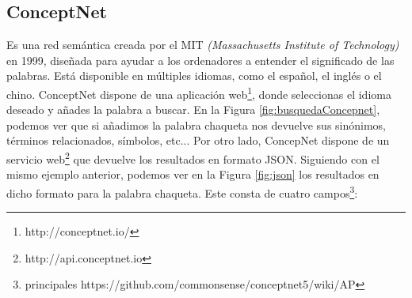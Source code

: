 \subsection{ConceptNet} 
\label{cap:subsec:concepnet}

Es una red semántica creada por el MIT \textit{(Massachusetts Institute of Technology)} en 1999, diseñada para ayudar a los ordenadores a entender el significado de las palabras. Está disponible en múltiples idiomas, como el español, el inglés o el chino. ConceptNet dispone de una aplicación web\footnote{http://conceptnet.io/}, donde seleccionas el idioma deseado y añades la palabra a buscar. En la Figura  \ref{fig:busquedaConcepnet}, podemos ver que si añadimos la palabra chaqueta nos devuelve sus sinónimos, términos relacionados, símbolos, etc...
Por otro lado, ConcepNet dispone de un servicio web\footnote{http://api.conceptnet.io} que devuelve los resultados en formato JSON. Siguiendo con el mismo ejemplo anterior, podemos ver en la Figura  \ref{fig:json} los resultados en dicho formato para la palabra chaqueta. Este consta de cuatro campos\footnote{principales https://github.com/commonsense/conceptnet5/wiki/AP}:
